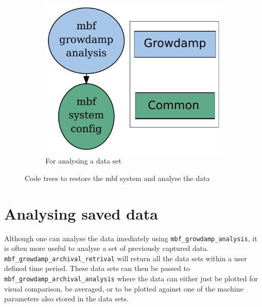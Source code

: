 \documentclass{report}
\begin{document}
\begin{figure}[hbt]
\begin{subfigure}[b]{0.3\textwidth}
        \includegraphics[width=\textwidth]{mbf_growdamp_analysis.pdf}
        \caption{For analysing a data set}
        \label{fig:growdamp_analysis}
    \end{subfigure}
    \caption{Code trees to restore the mbf system and analyse the data}\label{fig:growdamp_code_trees2}
\end{figure}

\section{Analysing saved data}
Although one can analyse the data imediately using \verb|mbf_growdamp_analysis|, it is often more useful to analyse a set of previously captured data. \verb|mbf_growdamp_archival_retrival| will return all the data sets within a user defined time period. These data sets can then be passed to \verb|mbf_growdamp_archival_analysis| where the data can either just be plotted for visual comparison, be averaged, or to be plotted against one of the machine parameters also stored in the data sets.
\end{document}
